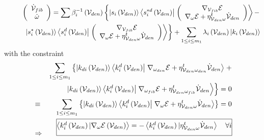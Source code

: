 \begin{eqnarray}
&&\left( 
\begin{array}{c}
{\cal \dot{V}}_{fib} \\ 
\dot{\omega}%
\end{array}%
\right) =\sum \beta _{i}^{-1}\left( {\cal V}_{den}\right) \left\{ \left|
s_{i}\left( {\cal V}_{den}\right) \right\rangle \left\langle s_{i}^{\ast
d}\left( {\cal V}_{den}\right) \right| \left. \left( 
\begin{array}{c}
\nabla _{{\cal V}_{fib}}{\cal E} \\ 
\nabla _{\omega }{\cal E}+\eta _{{\cal V}_{den}\omega }^{t}{\cal \dot{V}}%
_{den}%
\end{array}%
\right) \right\rangle -\right.  \nonumber \\
&&\qquad \left. \left| s_{i}^{\ast }\left( {\cal V}_{den}\right)
\right\rangle \left\langle s_{i}^{d}\left( {\cal V}_{den}\right) \right|
\left. \left( 
\begin{array}{c}
\nabla _{{\cal V}_{fib}}{\cal E} \\ 
\nabla _{\omega }{\cal E}+\eta _{{\cal V}_{den}\omega }^{t}{\cal \dot{V}}%
_{den}%
\end{array}%
\right) \right\rangle \right\} +\sum_{1\leq i\leq m_{1}}\lambda _{i}\left( 
{\cal V}_{den}\right) \left| k_{i}\left( {\cal V}_{den}\right) \right\rangle
\end{eqnarray}%
with the constraint%
\begin{eqnarray}
&&\sum_{1\leq i\leq m_{1}}\left\{ \left| k_{di}\left( {\cal V}_{den}\right)
\right\rangle \left\langle k_{i}^{d}\left( {\cal V}_{den}\right) \right|
\left. \nabla _{\omega _{den}}{\cal E}+\eta _{{\cal V}_{den}\omega
_{den}}^{t}{\cal \dot{V}}_{den}\right\rangle \right. +  \nonumber \\
&&\quad \left. \left| k_{di}\left( {\cal V}_{den}\right) \right\rangle
\left\langle k_{i}^{d}\left( {\cal V}_{den}\right) \right| \left. \nabla
_{\omega _{fib}}{\cal E}+\eta _{{\cal V}_{den}\omega _{fib}}^{t}{\cal \dot{V}%
}_{den}\right\rangle \right\} =0  \nonumber \\
&\equiv &\sum_{1\leq i\leq m_{1}}\left\{ \left| k_{di}\left( {\cal V}%
_{den}\right) \right\rangle \left\langle k_{i}^{d}\left( {\cal V}%
_{den}\right) \right| \left. \nabla _{\omega }{\cal E}+\eta _{{\cal V}%
_{den}\omega }^{t}{\cal \dot{V}}_{den}\right\rangle \right\} =0  \nonumber \\
&\Rightarrow &\frame{$%
\mathrel{\mathop{\stackrel{}{\left\langle k_{i}^{d}\left( {\cal V}_{den}\right) |\nabla _{\omega }{\cal E}\left( {\cal V}_{den}\right) \right\rangle =-\left\langle k_{i}^{d}\left( {\cal V}_{den}\right) |\eta _{{\cal V}_{den}\omega }^{t}{\cal \dot{V}}_{den}\right\rangle \quad \forall i}}\limits_{}}%
$}
\end{eqnarray}%
